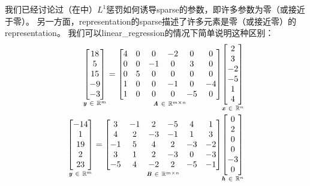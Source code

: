 我们已经讨论过（在中）$L^1$惩罚如何诱导\gls{sparse}的参数，即许多参数为零（或接近于零）。
另一方面，\gls{representation}的\gls{sparse}描述了许多元素是零（或接近零）的\gls{representation}。
我们可以\gls{linear_regression}的情况下简单说明这种区别：
\begin{align}
\underset{\boldsymbol{\mathit{y}} ~\in~ \mathbb{R}^m}{
 \begin{bmatrix}
  18 \\  5 \\ 15 \\ -9 \\ -3
 \end{bmatrix}} = 
 \underset{\boldsymbol{\mathit{A}} ~\in~ \mathbb{R}^{m \times n}}{
 \begin{bmatrix}
  4 & 0 & 0 & -2 & 0 & 0 \\
  0 & 0 & -1 & 0 & 3 & 0 \\
  0 & 5 & 0 & 0 & 0 & 0 \\
  1 & 0 & 0 & -1 & 0 & -4 \\
  1 & 0 & 0 & 0 & -5 & 0
 \end{bmatrix}} 
  \underset{\boldsymbol{\mathit{x}} ~\in~ \mathbb{R}^n}{
  \begin{bmatrix}
 2 \\ 3\\ -2\\ -5 \\ 1 \\ 4
 \end{bmatrix} }\\
 \underset{\boldsymbol{\mathit{y}} ~\in~ \mathbb{R}^m}{
 \begin{bmatrix}
  -14 \\  1 \\ 19 \\  2 \\ 23
 \end{bmatrix}} = 
 \underset{\boldsymbol{\mathit{B}} ~\in~ \mathbb{R}^{m \times n}}{
 \begin{bmatrix}
  3 & -1 & 2 & -5 & 4 & 1 \\
  4 & 2 & -3 & -1 & 1 & 3 \\
  -1 & 5 & 4 & 2 & -3 & -2 \\
  3 & 1 & 2 & -3 & 0 & -3 \\
  -5 & 4 & -2 & 2 & -5 & -1
 \end{bmatrix}} 
  \underset{\boldsymbol{\mathit{h}} ~\in~ \mathbb{R}^n}{
  \begin{bmatrix}
 0 \\ 2 \\ 0 \\ 0 \\ -3 \\ 0
 \end{bmatrix} }
\end{align}

